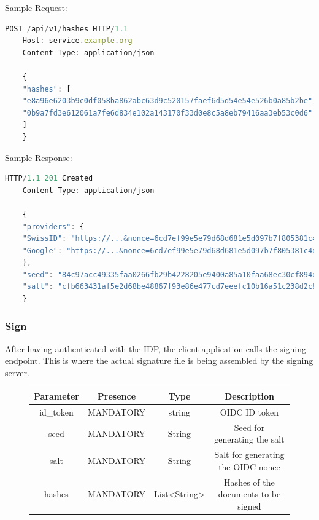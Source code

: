 Sample Request:

\begin{lstlisting}[caption={login request}, captionpos=b, language=JavaScript, label={lst:hashesrequest}]
    POST /api/v1/hashes HTTP/1.1
    Host: service.example.org
    Content-Type: application/json

    {
    "hashes": [
    "e8a96e6203b9c0df058ba862abc63d9c520157faef6d5d54e54e526b0a85b2be",
    "0b9a7fd3e612061a7fe6d834e102a143170f33d0e8c5a8eb79416aa3eb53c0d6"
    ]
    }
\end{lstlisting}

Sample Response:

\begin{lstlisting}[caption={login response}, captionpos=b, language=JavaScript, label={lst:hashesresponse}]
    HTTP/1.1 201 Created
    Content-Type: application/json

    {
    "providers": {
    "SwissID": "https://...&nonce=6cd7ef99e5e79d68d681e5d097b7f805381c4d013152fa3f26d06bd728ae49fa",
    "Google": "https://...&nonce=6cd7ef99e5e79d68d681e5d097b7f805381c4d013152fa3f26d06bd728ae49fa"
    },
    "seed": "84c97acc49335faa0266fb29b4228205e9400a85a10faa68ec30cf894e1730ed",
    "salt": "cfb663431af5e2d68be48867f93e86e477cd7eeefc10b16a51c238d2c810561b"
    }
\end{lstlisting}

\subsubsection{Sign}\label{subsubsec:signrequest}
After having authenticated with the IDP, the client application calls the signing endpoint.
This is where the actual signature file is being assembled by the signing server.

\begin{figure}[H]
    \begin{center}
        \begin{tabular}{c|c|c|c}
            \textbf{Parameter} & \textbf{Presence} & \textbf{Type} & \textbf{Description} \\
            \hline
            id\_token & MANDATORY & string & OIDC ID token \\
            \hline
            seed & MANDATORY & String & Seed for generating the salt \\
            \hline
            salt & MANDATORY & String & Salt for generating the OIDC nonce \\
            \hline
            hashes & MANDATORY & List<String> & Hashes of the documents to be signed \\
        \end{tabular}
    \end{center}
\end{figure}

